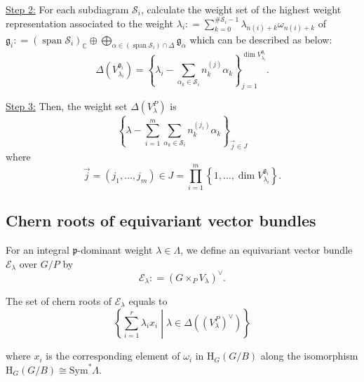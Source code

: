 \documentclass[uplatex,dvipdfmx]{jsarticle}
\newcommand{\defeq}{\mathrel{\mathop:}=}
\newcommand{\Sym}{\mathrm{Sym}}
\begin{document}
\underline{Step 2:}
For each subdiagram 
$\mathcal{S}_i$, 
calculate the weight set of the highest weight representation
associated to the weight
$\lambda_i 
\defeq
\sum_{k = 0}^{\# \mathcal{S}_i - 1}
\lambda_{n(i) + k} \omega_{n(i) + k}$
of 
$\mathfrak{g}_i
\defeq
(\operatorname{span} \mathcal{S}_i)_\mathbb{C} 
\oplus 
\bigoplus_{\alpha \in (\operatorname{span} \mathcal{S}_i)\cap \Delta}
\mathfrak{g}_\alpha$ which can be described as below:
\begin{equation}
    \Delta\left( 
        V
        ^{\mathfrak{g}_i}
        _{\lambda_i}
    \right)
    =
    \left\{ 
        \lambda_i - \sum_{\alpha_k \in \mathcal{S}_i} n_k^{(j)} \alpha_k
    \right\}
    _{j = 1}
    ^{\operatorname{dim}
        V
        ^{\mathfrak{g}_i}
        _{\lambda_i}}.
\end{equation}

\underline{Step 3:}
Then, the weight set 
$\Delta(V_\lambda^P)$
is
\begin{equation}
    \left\{ 
        \lambda 
        - 
        \sum_{i = 1}^m
        \sum_{\alpha_k \in \mathcal{S}_i} 
        n_k^{(j_i)} \alpha_k
    \right\}_{\vec{j} \in J}
\end{equation}
where
\begin{equation}
    \vec{j}
    =
    \left( j_1, \ldots, j_m \right)
    \in
    J
    =
    \prod_{i = 1}^m
    \left\{ 1, \ldots, \operatorname{dim} V^{\mathfrak{g}_i}_{\lambda_i} \right\}.
\end{equation}

\subsection{Chern roots of equivariant vector bundles}

For an integral
$\mathfrak{p}$-dominant
weight
$\lambda \in \Lambda$,
we define an equivariant vector bundle 
$\mathcal{E}_\lambda$
over
$G/P$
by
\begin{equation}
    \mathcal{E}_\lambda
    \defeq
    \left( 
        G
        \times_P
        V_\lambda
     \right)^{\vee}.
\end{equation}

The set of chern roots of
$\mathcal{E}_\lambda$
equals to
\begin{equation}
    \left\{ 
        \sum_{i = 1}^r
        \lambda_i
        x_i
        \middle|
        \lambda \in \Delta((V_\lambda^P)^{\vee})
    \right\}
\end{equation}

where
$x_i$
is the corresponding element of
$\omega_i$
in
$\mathrm{H}_G(G/B)$
along the isomorphism
$\mathrm{H}_G(G/B) \cong \Sym^* \Lambda$.
\end{document}
